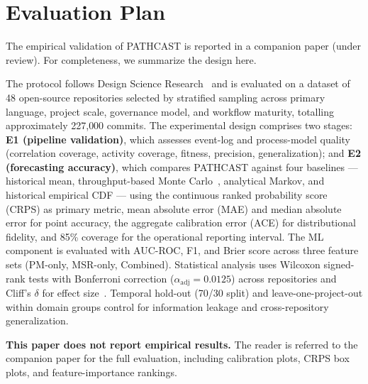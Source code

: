 %

\section{Evaluation Plan}
\label{sec:evaluation-plan}

The empirical validation of PATHCAST is reported in a companion paper
(under review). For completeness, we summarize the design here.

The protocol follows Design Science
Research~\cite{hevner2004, peffers2007} and is evaluated on a dataset of
48 open-source repositories selected by stratified sampling across
primary language, project scale, governance model, and workflow
maturity, totalling approximately 227{,}000 commits. The experimental
design comprises two stages: \textbf{E1 (pipeline validation)}, which
assesses event-log and process-model quality (correlation coverage,
activity coverage, fitness, precision, generalization); and \textbf{E2
(forecasting accuracy)}, which compares PATHCAST against four baselines
--- historical mean, throughput-based Monte Carlo~\cite{vacanti2015},
analytical Markov, and historical empirical
CDF --- using the continuous ranked probability score (CRPS) as primary
metric, mean absolute error (MAE) and median absolute error for point
accuracy, the aggregate calibration error (ACE) for distributional
fidelity, and 85\% coverage for the operational reporting interval. The
ML component is evaluated with AUC-ROC, F1, and Brier score across three
feature sets (PM-only, MSR-only, Combined). Statistical analysis uses
Wilcoxon signed-rank tests with Bonferroni correction
($\alpha_{\text{adj}} = 0.0125$) across repositories and Cliff's
$\delta$ for effect size~\cite{kampenes2007systematic}. Temporal
hold-out (70/30 split) and leave-one-project-out within domain groups
control for information leakage and cross-repository generalization.

\textbf{This paper does not report empirical results.} The reader is
referred to the companion paper for the full evaluation, including
calibration plots, CRPS box plots, and feature-importance rankings.

